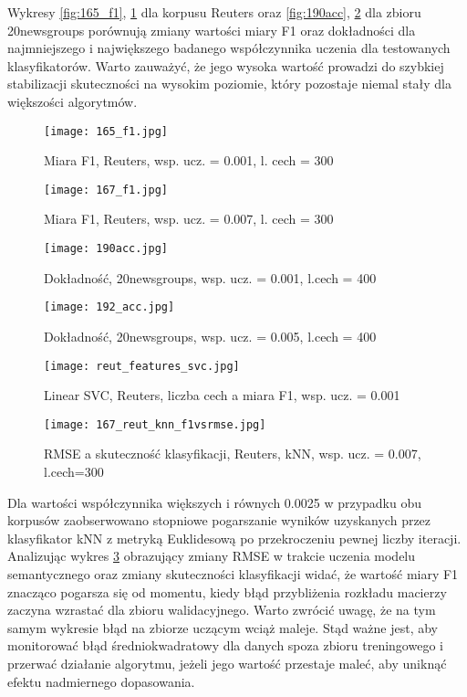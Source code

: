 \documentclass{pracamgr}
\begin{document}
Wykresy \ref{fig:165_f1}, \ref{fig:167_f1} dla korpusu Reuters oraz \ref{fig:190acc}, \ref{fig:192acc} dla zbioru 20newsgroups porównują zmiany wartości miary F1 oraz dokładności dla najmniejszego i największego badanego współczynnika uczenia dla testowanych klasyfikatorów. Warto zauważyć, że jego wysoka wartość prowadzi do szybkiej stabilizacji skuteczności na wysokim poziomie, który pozostaje niemal stały dla większości algorytmów.

\begin{figure}[]
  \texttt{[image: 165\_f1.jpg]}
  \caption{Miara F1, Reuters, wsp. ucz. = 0.001, l. cech = 300}\label{fig:165_f1}
\endminipage\hfill
{}%
  \texttt{[image: 167\_f1.jpg]}
  \caption{Miara F1, Reuters, wsp. ucz. = 0.007, l. cech = 300}\label{fig:167_f1}
\endminipage
\end{figure}

\begin{figure}[]
  \texttt{[image: 190acc.jpg]}
  \caption{Dokładność, 20newsgroups, wsp. ucz. = 0.001, l.cech = 400}\label{fig:190acc}
\endminipage\hfill
{}%
  \texttt{[image: 192\_acc.jpg]}
  \caption{Dokładność, 20newsgroups, wsp. ucz. = 0.005, l.cech = 400}\label{fig:192acc}
\endminipage\hfill
\end{figure}

\begin{figure}[]
%
  \texttt{[image: reut\_features\_svc.jpg]}
  \caption{Linear SVC, Reuters, liczba cech a miara F1, wsp. ucz. = 0.001}\label{fig:reut_features_svc}
\endminipage\hfill
{}
  \texttt{[image: 167\_reut\_knn\_f1vsrmse.jpg]}
  \caption{RMSE a skuteczność klasyfikacji, Reuters, kNN, wsp. ucz. = 0.007, l.cech=300}\label{fig:167_reut_knn_f1vsrmse}
\endminipage\hfill
\end{figure}

Dla wartości współczynnika większych i równych 0.0025 w przypadku obu korpusów zaobserwowano stopniowe pogarszanie wyników uzyskanych przez klasyfikator kNN z metryką Euklidesową po przekroczeniu pewnej liczby iteracji. Analizując wykres \ref{fig:167_reut_knn_f1vsrmse} obrazujący zmiany RMSE w trakcie uczenia modelu semantycznego oraz zmiany skuteczności klasyfikacji widać, że wartość miary F1 znacząco pogarsza się od momentu, kiedy błąd przybliżenia rozkładu macierzy zaczyna wzrastać dla zbioru walidacyjnego. Warto zwrócić uwagę, że na tym samym wykresie błąd na zbiorze uczącym wciąż maleje. Stąd ważne jest, aby monitorować błąd średniokwadratowy dla danych spoza zbioru treningowego i przerwać działanie algorytmu, jeżeli jego wartość przestaje maleć, aby uniknąć efektu nadmiernego dopasowania.
\end{document}
